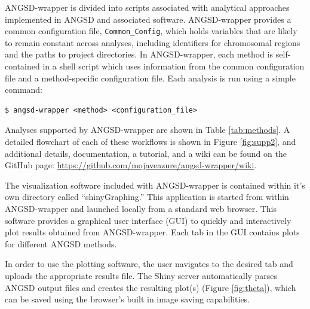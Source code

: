 \documentclass[10pt,a4paper]{article}
\newcommand{\ph}[1]{\todo[size=\scriptsize, color=pink]{#1}}
\begin{document}
ANGSD-wrapper is divided into scripts associated with analytical approaches implemented in ANGSD and associated software. 
ANGSD-wrapper provides a common configuration file, \texttt{Common\_Config}, which holds variables that are likely to remain constant across analyses, including identifiers for chromosomal regions and the paths to project directories.
In ANGSD-wrapper, each method is self-contained in a shell script which uses information from the common configuration file and a method-specific configuration file. 
Each analysis is run using a simple command:

\begin{lstlisting}
$ angsd-wrapper <method> <configuration_file>
\end{lstlisting}

Analyses supported by ANGSD-wrapper are shown in Table \ref{tab:methods}.
A detailed flowchart of each of these workflows is shown in Figure \ref{fig:supp2}, and additional details, documentation, a tutorial, and a wiki can be found on the GitHub page: \url{https://github.com/mojaveazure/angsd-wrapper/wiki}.

\ph{Necessary?}The visualization software included with ANGSD-wrapper is contained within it's own directory called ``shinyGraphing.''
This application is started from within ANGSD-wrapper and launched locally from a standard web browser. %
This software provides a graphical user interface (GUI) to quickly and interactively plot results obtained from ANGSD-wrapper.  
Each tab in the GUI contains plots for different ANGSD methods.

In order to use the plotting software, the user navigates to the desired tab and uploads the appropriate results file. 
The Shiny server automatically parses ANGSD output files and creates the resulting plot(s) (Figure \ref{fig:theta}), which can be saved using the browser's built in image saving capabilities.
\end{document}
